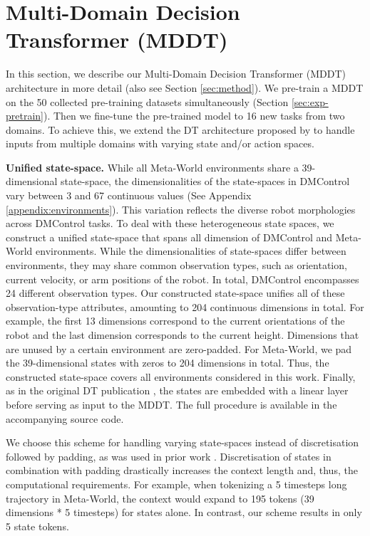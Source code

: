 \section{Multi-Domain Decision Transformer (MDDT)}\label{appendix:mddt}
In this section, we describe our Multi-Domain Decision Transformer (MDDT) architecture in more detail (also see Section \ref{sec:method}).
We pre-train a MDDT on the 50 collected pre-training datasets simultaneously (Section \ref{sec:exp-pretrain}). Then we fine-tune the pre-trained model to 16 new tasks from two domains. 
To achieve this, we extend the DT architecture proposed by \citet{Chen:21} to handle inputs from multiple domains with varying state and/or action spaces.

\textbf{Unified state-space.} 
While all Meta-World environments share a 39-dimensional state-space, the dimensionalities of the state-spaces in DMControl vary between 3 and 67 continuous values (See Appendix \ref{appendix:environments}). This variation reflects the diverse robot morphologies across DMControl tasks. 
To deal with these heterogeneous state spaces, we construct a unified state-space that spans all dimension of DMControl and Meta-World environments. While the dimensionalities of state-spaces differ between environments, they may share common observation types, such as orientation, current velocity, or arm positions of the robot. In total, DMControl encompasses 24 different observation types. Our constructed state-space unifies all of these observation-type attributes, amounting to 204 continuous dimensions in total. For example, the first 13 dimensions correspond to the current orientations of the robot and the last dimension corresponds to the current height. Dimensions that are unused by a certain environment are zero-padded. For Meta-World, we pad the 39-dimensional states with zeros to 204 dimensions in total. 
Thus, the constructed state-space covers all environments considered in this work. Finally, as in the original DT publication \citep{Chen:21}, the states are embedded with a linear layer before serving as input to the MDDT. The full procedure is available in the accompanying source code.

We choose this scheme for handling varying state-spaces instead of discretisation followed by padding, as was used in prior work \citep{Reed:22}. Discretisation of states in combination with padding drastically increases the context length and, thus, the computational requirements. For example, when tokenizing a 5 timesteps long trajectory in Meta-World, the context would expand to 195 tokens (39 dimensions * 5 timesteps) for states alone. In contrast, our scheme results in only 5 state tokens. 

